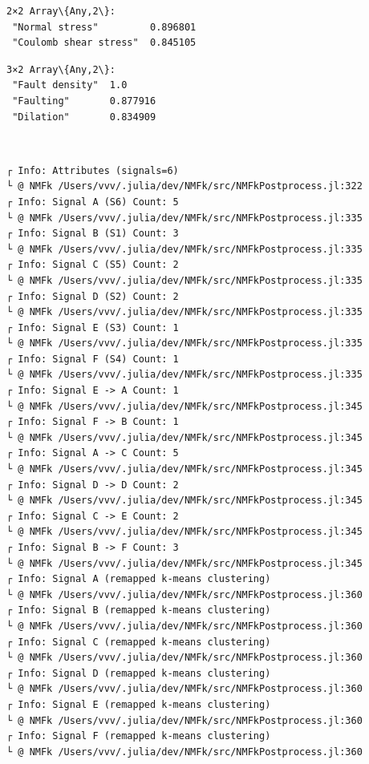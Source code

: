 \documentclass[11pt]{article}
\begin{document}
    
    
    \begin{Verbatim}[commandchars=\\\{\}]
2×2 Array\{Any,2\}:
 "Normal stress"         0.896801
 "Coulomb shear stress"  0.845105
    \end{Verbatim}

    
    
    \begin{Verbatim}[commandchars=\\\{\}]
3×2 Array\{Any,2\}:
 "Fault density"  1.0
 "Faulting"       0.877916
 "Dilation"       0.834909
    \end{Verbatim}

    
    \begin{center}
    \end{center}
    { \hspace*{\fill} \\}
    
    \begin{Verbatim}[commandchars=\\\{\}]
┌ Info: Attributes (signals=6)
└ @ NMFk /Users/vvv/.julia/dev/NMFk/src/NMFkPostprocess.jl:322
┌ Info: Signal A (S6) Count: 5
└ @ NMFk /Users/vvv/.julia/dev/NMFk/src/NMFkPostprocess.jl:335
┌ Info: Signal B (S1) Count: 3
└ @ NMFk /Users/vvv/.julia/dev/NMFk/src/NMFkPostprocess.jl:335
┌ Info: Signal C (S5) Count: 2
└ @ NMFk /Users/vvv/.julia/dev/NMFk/src/NMFkPostprocess.jl:335
┌ Info: Signal D (S2) Count: 2
└ @ NMFk /Users/vvv/.julia/dev/NMFk/src/NMFkPostprocess.jl:335
┌ Info: Signal E (S3) Count: 1
└ @ NMFk /Users/vvv/.julia/dev/NMFk/src/NMFkPostprocess.jl:335
┌ Info: Signal F (S4) Count: 1
└ @ NMFk /Users/vvv/.julia/dev/NMFk/src/NMFkPostprocess.jl:335
┌ Info: Signal E -> A Count: 1
└ @ NMFk /Users/vvv/.julia/dev/NMFk/src/NMFkPostprocess.jl:345
┌ Info: Signal F -> B Count: 1
└ @ NMFk /Users/vvv/.julia/dev/NMFk/src/NMFkPostprocess.jl:345
┌ Info: Signal A -> C Count: 5
└ @ NMFk /Users/vvv/.julia/dev/NMFk/src/NMFkPostprocess.jl:345
┌ Info: Signal D -> D Count: 2
└ @ NMFk /Users/vvv/.julia/dev/NMFk/src/NMFkPostprocess.jl:345
┌ Info: Signal C -> E Count: 2
└ @ NMFk /Users/vvv/.julia/dev/NMFk/src/NMFkPostprocess.jl:345
┌ Info: Signal B -> F Count: 3
└ @ NMFk /Users/vvv/.julia/dev/NMFk/src/NMFkPostprocess.jl:345
┌ Info: Signal A (remapped k-means clustering)
└ @ NMFk /Users/vvv/.julia/dev/NMFk/src/NMFkPostprocess.jl:360
┌ Info: Signal B (remapped k-means clustering)
└ @ NMFk /Users/vvv/.julia/dev/NMFk/src/NMFkPostprocess.jl:360
┌ Info: Signal C (remapped k-means clustering)
└ @ NMFk /Users/vvv/.julia/dev/NMFk/src/NMFkPostprocess.jl:360
┌ Info: Signal D (remapped k-means clustering)
└ @ NMFk /Users/vvv/.julia/dev/NMFk/src/NMFkPostprocess.jl:360
┌ Info: Signal E (remapped k-means clustering)
└ @ NMFk /Users/vvv/.julia/dev/NMFk/src/NMFkPostprocess.jl:360
┌ Info: Signal F (remapped k-means clustering)
└ @ NMFk /Users/vvv/.julia/dev/NMFk/src/NMFkPostprocess.jl:360
    \end{Verbatim}
\end{document}

